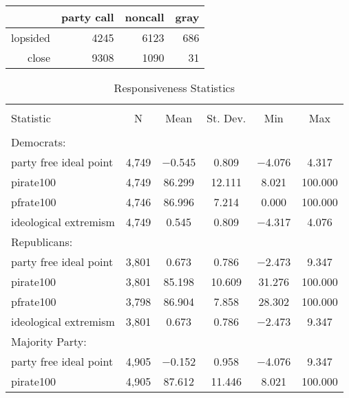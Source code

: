 \documentclass[12pt]{article}
\begin{document}
\begin{table}[ht]
	\centering
	\begin{tabular}{rrrr}
		\hline
		& party call & noncall & gray \\ 
		\hline
		lopsided & 4245 & 6123 & 686 \\ 
		close & 9308 & 1090 &  31 \\ 
		\hline
	\end{tabular}
\end{table}

\begin{table}[!htbp] \centering 
	\caption{Responsiveness Statistics} 
	\label{} 
	\begin{tabular}{@{\extracolsep{5pt}}lccccc} 
		\\[-1.8ex]\hline 
		\hline \\[-1.8ex] 
		Statistic & \multicolumn{1}{c}{N} & \multicolumn{1}{c}{Mean} & \multicolumn{1}{c}{St. Dev.} & \multicolumn{1}{c}{Min} & \multicolumn{1}{c}{Max} \\ 
		\hline \\[-1.8ex] 
		Democrats: & & & & & \\
		\hline
		party free ideal point & 4,749 & $-$0.545 & 0.809 & $-$4.076 & 4.317 \\ 
		pirate100 & 4,749 & 86.299 & 12.111 & 8.021 & 100.000 \\ 
		pfrate100 & 4,746 & 86.996 & 7.214 & 0.000 & 100.000 \\ 
		ideological extremism & 4,749 & 0.545 & 0.809 & $-$4.317 & 4.076 \\ 
		\hline
		Republicans: & & & & & \\
		\hline
		party free ideal point & 3,801 & 0.673 & 0.786 & $-$2.473 & 9.347 \\ 
		pirate100 & 3,801 & 85.198 & 10.609 & 31.276 & 100.000 \\ 
		pfrate100 & 3,798 & 86.904 & 7.858 & 28.302 & 100.000 \\ 
		ideological extremism & 3,801 & 0.673 & 0.786 & $-$2.473 & 9.347 \\
		\hline
		Majority Party: & & & & & \\
		\hline
		party free ideal point & 4,905 & $-$0.152 & 0.958 & $-$4.076 & 9.347 \\ 
		pirate100 & 4,905 & 87.612 & 11.446 & 8.021 & 100.000 \\ 

\end{tabular}
\end{table}
\end{document}
